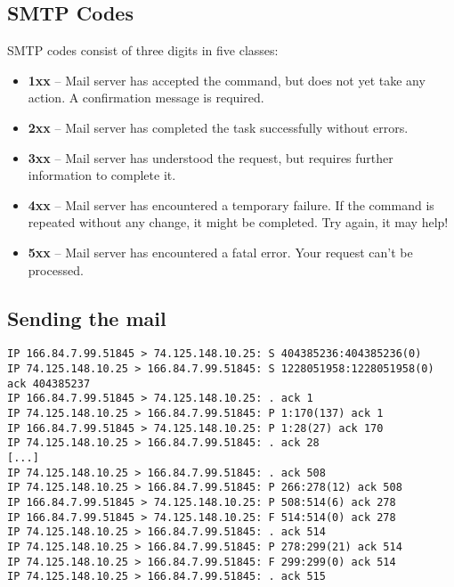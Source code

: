 \documentclass[xga]{xdvislides}
\begin{document}
\subsection{SMTP Codes}
SMTP codes consist of three digits in five classes:
\begin{itemize}
	\item {\bf 1xx} --  Mail server has accepted the command, but does not yet
		take any action. A confirmation message is required.
	\item {\bf 2xx} --  Mail server has completed the task successfully
		without errors.
	\item {\bf 3xx} --  Mail server has understood the request, but requires
		further information to complete it.
	\item {\bf 4xx} --  Mail server has encountered a temporary failure. If
		the command is repeated without any change, it might be
		completed. Try again, it may help!
	\item {\bf 5xx} --  Mail server has encountered a fatal error. Your
		request can't be processed.
\end{itemize}

\subsection{Sending the mail}
\begin{verbatim}
IP 166.84.7.99.51845 > 74.125.148.10.25: S 404385236:404385236(0)
IP 74.125.148.10.25 > 166.84.7.99.51845: S 1228051958:1228051958(0) ack 404385237
IP 166.84.7.99.51845 > 74.125.148.10.25: . ack 1
IP 74.125.148.10.25 > 166.84.7.99.51845: P 1:170(137) ack 1
IP 166.84.7.99.51845 > 74.125.148.10.25: P 1:28(27) ack 170
IP 74.125.148.10.25 > 166.84.7.99.51845: . ack 28
[...]
IP 74.125.148.10.25 > 166.84.7.99.51845: . ack 508
IP 74.125.148.10.25 > 166.84.7.99.51845: P 266:278(12) ack 508
IP 166.84.7.99.51845 > 74.125.148.10.25: P 508:514(6) ack 278
IP 166.84.7.99.51845 > 74.125.148.10.25: F 514:514(0) ack 278
IP 74.125.148.10.25 > 166.84.7.99.51845: . ack 514
IP 74.125.148.10.25 > 166.84.7.99.51845: P 278:299(21) ack 514
IP 74.125.148.10.25 > 166.84.7.99.51845: F 299:299(0) ack 514
IP 74.125.148.10.25 > 166.84.7.99.51845: . ack 515
\end{verbatim}
\Normalsize
\end{document}
